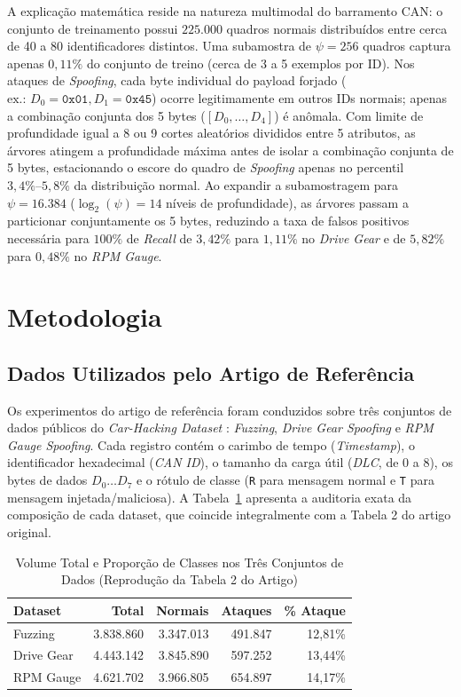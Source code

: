 \documentclass[conference]{IEEEtran}
\begin{document}
A explicação matemática reside na natureza multimodal do barramento CAN: o conjunto de treinamento possui $225.000$ quadros normais distribuídos entre cerca de 40 a 80 identificadores distintos. Uma subamostra de $\psi = 256$ quadros captura apenas $0{,}11\%$ do conjunto de treino (cerca de 3 a 5 exemplos por ID). Nos ataques de \textit{Spoofing}, cada byte individual do payload forjado ($\text{ex.: } D_0=\texttt{0x01}, D_1=\texttt{0x45}$) ocorre legitimamente em outros IDs normais; apenas a combinação conjunta dos 5 bytes ($[D_0, \dots, D_4]$) é anômala. Com limite de profundidade igual a 8 ou 9 cortes aleatórios divididos entre 5 atributos, as árvores atingem a profundidade máxima antes de isolar a combinação conjunta de 5 bytes, estacionando o escore do quadro de \textit{Spoofing} apenas no percentil $3{,}4\%\text{--}5{,}8\%$ da distribuição normal. Ao expandir a subamostragem para $\psi = 16.384$ ($\log_2(\psi) = 14$ níveis de profundidade), as árvores passam a particionar conjuntamente os 5 bytes, reduzindo a taxa de falsos positivos necessária para $100\%$ de \textit{Recall} de $3{,}42\%$ para $1{,}11\%$ no \textit{Drive Gear} e de $5{,}82\%$ para $0{,}48\%$ no \textit{RPM Gauge}.

\section{Metodologia}

\subsection{Dados Utilizados pelo Artigo de Referência}
Os experimentos do artigo de referência foram conduzidos sobre três conjuntos de dados públicos do \textit{Car-Hacking Dataset} \cite{seo2018gids}: \textit{Fuzzing}, \textit{Drive Gear Spoofing} e \textit{RPM Gauge Spoofing}. Cada registro contém o carimbo de tempo (\textit{Timestamp}), o identificador hexadecimal (\textit{CAN ID}), o tamanho da carga útil (\textit{DLC}, de 0 a 8), os bytes de dados $D_0 \dots D_7$ e o rótulo de classe (\texttt{R} para mensagem normal e \texttt{T} para mensagem injetada/maliciosa). A Tabela~\ref{tab:dataset_audit} apresenta a auditoria exata da composição de cada dataset, que coincide integralmente com a Tabela 2 do artigo original.

\begin{table}[htbp]
\caption{Volume Total e Proporção de Classes nos Três Conjuntos de Dados (Reprodução da Tabela 2 do Artigo)}
\label{tab:dataset_audit}
\centering
\scriptsize
\setlength{\tabcolsep}{3.5pt}
\begin{tabular}{lrrrr}
\toprule
\textbf{Dataset} & \textbf{Total} & \textbf{Normais} & \textbf{Ataques} & \textbf{\% Ataque} \\
\midrule
Fuzzing & 3.838.860 & 3.347.013 & 491.847 & 12,81\% \\
Drive Gear & 4.443.142 & 3.845.890 & 597.252 & 13,44\% \\
RPM Gauge & 4.621.702 & 3.966.805 & 654.897 & 14,17\% \\
\bottomrule
\end{tabular}
\end{table}
\end{document}
